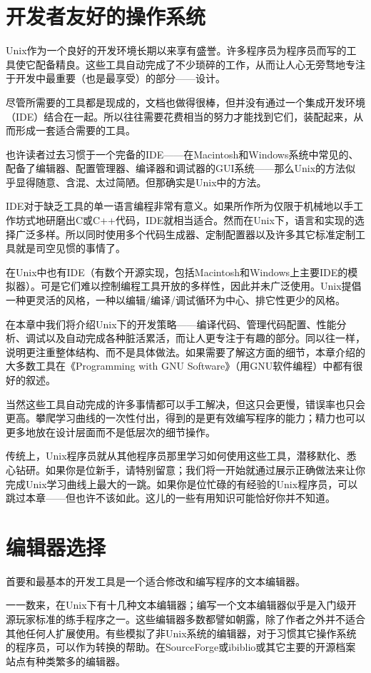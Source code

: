 \documentclass[12pt,oneside]{book}
\begin{document}
\section{开发者友好的操作系统}
Unix作为一个良好的开发环境长期以来享有盛誉。许多程序员为程序员而写的工具使它配备精良。这些工具自动完成了不少琐碎的工作，从而让人心无旁骛地专注于开发中最重要（也是最享受）的部分——设计。

尽管所需要的工具都是现成的，文档也做得很棒，但并没有通过一个集成开发环境（IDE）结合在一起。所以往往需要花费相当的努力才能找到它们，装配起来，从而形成一套适合需要的工具。

也许读者过去习惯于一个完备的IDE——在Macintosh和Windows系统中常见的、配备了编辑器、配置管理器、编译器和调试器的GUI系统——那么Unix的方法似乎显得随意、含混、太过简陋。但那确实是Unix中的方法。

IDE对于缺乏工具的单一语言编程非常有意义。如果所作所为仅限于机械地以手工作坊式地研磨出C或C++代码，IDE就相当适合。然而在Unix下，语言和实现的选择广泛多样。所以同时使用多个代码生成器、定制配置器以及许多其它标准定制工具就是司空见惯的事情了。

在Unix中也有IDE（有数个开源实现，包括Macintosh和Windows上主要IDE的模拟器）。可是它们难以控制编程工具开放的多样性，因此并未广泛使用。Unix提倡一种更灵活的风格，一种以编辑/编译/调试循环为中心、排它性更少的风格。

在本章中我们将介绍Unix下的开发策略——编译代码、管理代码配置、性能分析、调试以及自动完成各种脏活累活，而让人更专注于有趣的部分。同以往一样，说明更注重整体结构、而不是具体做法。如果需要了解这方面的细节，本章介绍的大多数工具在《Programming with GNU Software》（用GNU软件编程）\cite{Loukides-Oram}中都有很好的叙述。

当然这些工具自动完成的许多事情都可以手工解决，但这只会更慢，错误率也只会更高。攀爬学习曲线的一次性付出，得到的是更有效编写程序的能力；精力也可以更多地放在设计层面而不是低层次的细节操作。

传统上，Unix程序员就从其他程序员那里学习如何使用这些工具，潜移默化、悉心钻研。如果你是位新手，请特别留意；我们将一开始就通过展示正确做法来让你完成Unix学习曲线上最大的一跳。如果你是位忙碌的有经验的Unix程序员，可以跳过本章——但也许不该如此。这儿的一些有用知识可能恰好你并不知道。

\section{编辑器选择}
首要和最基本的开发工具是一个适合修改和编写程序的文本编辑器。

一一数来，在Unix下有十几种文本编辑器；编写一个文本编辑器似乎是入门级开源玩家标准的练手程序之一。这些编辑器多数都譬如朝露，除了作者之外并不适合其他任何人扩展使用。有些模拟了非Unix系统的编辑器，对于习惯其它操作系统的程序员，可以作为转换的帮助。在SourceForge或ibiblio或其它主要的开源档案站点有种类繁多的编辑器。
\end{document}
